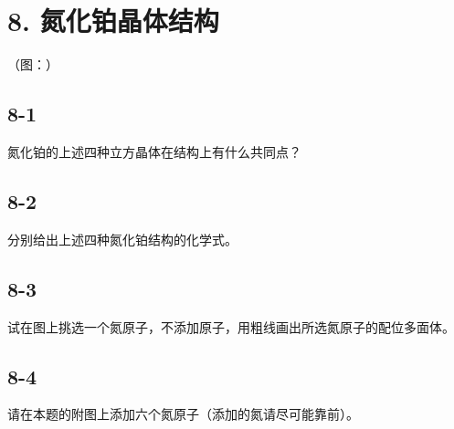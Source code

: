 \section*{8. 氮化铂晶体结构}
（图：）

\subsection*{8-1}
氮化铂的上述四种⽴⽅晶体在结构上有什么共同点？

\subsection*{8-2}
分别给出上述四种氮化铂结构的化学式。

\subsection*{8-3}
试在图上挑选⼀个氮原⼦，不添加原⼦，⽤粗线画出所选氮原⼦的配位多⾯体。

\subsection*{8-4}
请在本题的附图上添加六个氮原⼦（添加的氮请尽可能靠前）。
